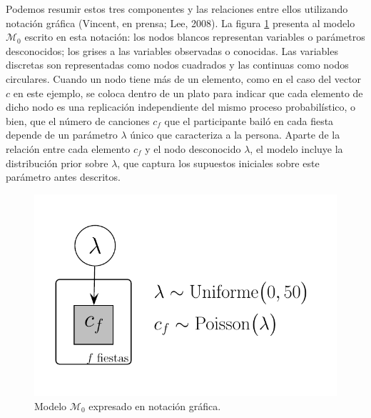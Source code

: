 \documentclass{article}
\begin{document}
\indent Podemos resumir estos tres componentes y las relaciones entre ellos utilizando notación gráfica (Vincent, en prensa; Lee, 2008). La figura \ref{fig:m_0} presenta al modelo $\mathcal M_0$ escrito en esta notación: los nodos blancos representan variables o parámetros desconocidos; los grises a las variables observadas o conocidas. Las variables discretas son representadas como nodos cuadrados y las continuas como nodos circulares. Cuando un nodo tiene más de un elemento, como en el caso del vector $c$ en este ejemplo, se coloca dentro de un plato para indicar que cada elemento de dicho nodo es una replicación independiente del mismo proceso probabilístico, o bien, que el número de canciones $c_f$ que el participante bailó en cada fiesta depende de un parámetro $\lambda$ único que caracteriza a la persona. Aparte de la relación entre cada elemento $c_f$ y el nodo desconocido $\lambda$, el modelo incluye la distribución prior sobre $\lambda$, que captura los supuestos iniciales sobre este parámetro antes descritos.\\

\begin{figure}[H]
\centerline{\includegraphics[width=.7\textwidth]{m_0.pdf}}
\caption{Modelo $\mathcal M_0$ expresado en notación gráfica.}
\label{fig:m_0}
\end{figure}
\end{document}
